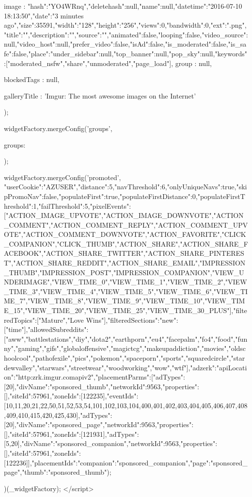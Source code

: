 {{{{            image               : {"hash":"YO4WRnq","deletehash":null,"name":null,"datetime":"2016-07-10 18:13:50","date":"3 minutes ago","size":35591,"width":"128","height":"256","views":0,"bandwidth":0,"ext":".png","title":"","description":"","source":"","animated":false,"looping":false,"video_source":null,"video_host":null,"prefer_video":false,"isAd":false,"is_moderated":false,"is_safe":false,"place":{"under_sidebar":null,"top_banner":null,"pop_sky":null,"keywords":["moderated_nsfw","share","unmoderated","page_load"]}},
            group               : null,
        
            blockedTags         : null,
        
        
            galleryTitle        : 'Imgur: The most awesome images on the Internet'
        });

        widgetFactory.mergeConfig('groups', {
            groups: {
                
            }
        });

        widgetFactory.mergeConfig('promoted', {"userCookie":"AZUSER","distance":5,"navThreshold":6,"onlyUniqueNavs":true,"skipPromoNav":false,"populateFirst":true,"populateFirstDistance":0,"populateFirstThreshold":1,"failThreshold":5,"pixelEvents":["ACTION_IMAGE_UPVOTE","ACTION_IMAGE_DOWNVOTE","ACTION_COMMENT","ACTION_COMMENT_REPLY","ACTION_COMMENT_UPVOTE","ACTION_COMMENT_DOWNVOTE","ACTION_FAVORITE","CLICK_COMPANION","CLICK_THUMB","ACTION_SHARE","ACTION_SHARE_FACEBOOK","ACTION_SHARE_TWITTER","ACTION_SHARE_PINTEREST","ACTION_SHARE_REDDIT","ACTION_SHARE_EMAIL","IMPRESSION_THUMB","IMPRESSION_POST","IMPRESSION_COMPANION","VIEW_UNDERIMAGE","VIEW_TIME_0","VIEW_TIME_1","VIEW_TIME_2","VIEW_TIME_3","VIEW_TIME_4","VIEW_TIME_5","VIEW_TIME_6","VIEW_TIME_7","VIEW_TIME_8","VIEW_TIME_9","VIEW_TIME_10","VIEW_TIME_15","VIEW_TIME_20","VIEW_TIME_25","VIEW_TIME_30_PLUS"],"filteredTopics":["Mature","Love Wins"],"filteredSections":{"new":["time"]},"allowedSubreddits":["aww","battlestations","diy","dota2","earthporn","eu4","facepalm","fo4","food","funny","gaming","gifs","globaloffensive","magictcg","makeupaddiction","movies","oldschoolcool","pathofexile","pics","pokemon","spaceporn","sports","squaredcircle","stardewvalley","starwars","streetwear","woodworking","wow","wtf"],"adzerk":{"apiLocation":"http:\/\/zrk.imgur.com\/api\/v2","placementParms":[{"adTypes":[20],"divName":"sponsored_thumb","networkId":9563,"properties":[],"siteId":57961,"zoneIds":[122235],"eventIds":[10,11,20,21,22,50,51,52,53,54,101,102,103,104,400,401,402,403,404,405,406,407,408,409,410,415,420,425,430]},{"adTypes":[20],"divName":"sponsored_page","networkId":9563,"properties":[],"siteId":57961,"zoneIds":[121931]},{"adTypes":[5,20],"divName":"sponsored_companion","networkId":9563,"properties":[],"siteId":57961,"zoneIds":[122236]}],"placementIds":{"companion":"sponsored_companion","page":"sponsored_page","thumb":"sponsored_thumb"}}});
    })(_widgetFactory);
    </script>

}}
